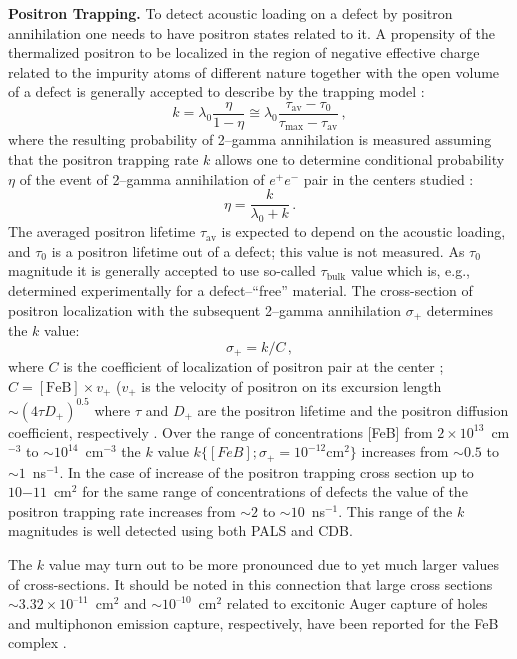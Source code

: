 \documentclass{ttp}
\begin{document}
\noindent \textbf{Positron Trapping.}
To detect acoustic loading on a defect by positron annihilation
one needs to have positron states related to it.
A propensity of the thermalized positron to be localized in the region of negative effective charge
related to the impurity atoms of different nature together
with the open volume of a defect is generally accepted to describe by the trapping model \cite{Brandt1974}:
\begin{equation}\label{eqA1}
  k=\lambda_0\frac{\eta}{1-\eta}\cong\lambda_0\frac{\tau_\mathrm{av}-\tau_0}{\tau_\mathrm{max}-\tau_\mathrm{av}}\,,
\end{equation}
where the resulting probability of  2–gamma annihilation
is measured assuming that the positron trapping rate $k$ allows one
to determine conditional probability $\eta$ of the event
of 2–gamma annihilation of $e^+e^-$ pair in the centers studied \cite{Brandt1974,Arutyunov2013}:
\begin{equation}\label{eqA2}
  \eta=\frac{k}{\lambda_0+k}\,.
\end{equation}
The averaged positron lifetime $\tau_\mathrm{av}$ is expected
to depend on the acoustic loading, and $\tau_0$ is a positron lifetime out of a defect;
this value is not measured.
As $\tau_0$ magnitude it is generally accepted to use so-called $\tau_\mathrm{bulk}$ value which is, e.g.,
determined experimentally for a defect--``free'' material.
The cross-section of positron localization with the subsequent 2--gamma annihilation $\sigma_+$ determines the $k$ value:
\begin{equation}\label{eqA3}
  \sigma_+=k/C\,,
\end{equation}
where $C$ is the coefficient of localization of positron pair at the center \cite{Krause1999};
$C=[\mathrm{FeB}]\times v_+$
($v_+$ is the velocity of positron on its excursion length $\sim (4\tau D_+)^{0.5}$
where $\tau$ and $D_+$ are the positron lifetime and the positron diffusion coefficient, respectively \cite{Krause1999,Brandt1974}.
Over the range of concentrations [FeB] from $2\times10^{13}$~cm$^{−3}$ to $\sim10^{14}$~cm$^{−3}$
the $k$ value $k\{[FeB]; \sigma_+ = 10^{−12} \mathrm{cm}^2\}$
increases from $\sim0.5$ to $\sim1$~ns$^{−1}$.
In the case of increase of the positron trapping cross section up to $10{−11}$~cm$^2$
for the same range of concentrations of defects the value of the positron trapping rate increases from $\sim2$ to $\sim10$~ns$^{−1}$.
This range of the $k$ magnitudes is well detected using both PALS and CDB.

The $k$ value may turn out to be more pronounced due to yet much larger values of cross-sections.
It should be noted in this connection that large cross sections $\sim\!3.32\times10^{–11}$~cm$^2$
and $\sim\!10^{–10}$~cm$^2$  related to excitonic Auger capture of holes and multiphonon emission capture,
respectively, have been reported for the FeB complex \cite{Paudyal2009,Istratov1999}.
\end{document}
